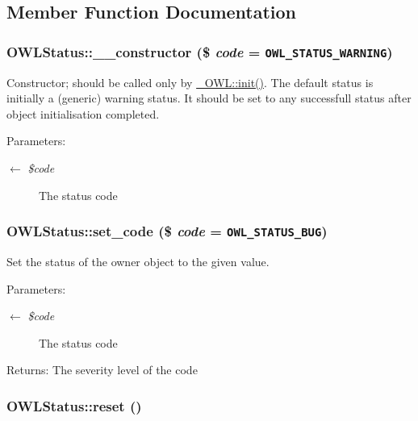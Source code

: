 \subsection{Member Function Documentation}
\hypertarget{classOWLStatus_ff9ed27ec31da2d4f5719aa1d522fea6}{
\subsubsection{\setlength{\rightskip}{0pt plus 5cm}OWLStatus::\_\-\_\-constructor (\$ {\em code} = {\tt OWL\_\-STATUS\_\-WARNING})}}
\label{classOWLStatus_ff9ed27ec31da2d4f5719aa1d522fea6}


Constructor; should be called only by \hyperlink{class__OWL_e0ef3ded56e8a6b34b6461e5a721cd3e}{\_\-OWL::init()}. The default status is initially a (generic) warning status. It should be set to any successfull status after object initialisation completed.

\begin{Desc}
\item[Parameters:]
\begin{description}
\item[\mbox{$\leftarrow$} {\em \$code}]The status code \end{description}
\end{Desc}
\hypertarget{classOWLStatus_1082207e060022757110d0aedbb524b1}{
\subsubsection{\setlength{\rightskip}{0pt plus 5cm}OWLStatus::set\_\-code (\$ {\em code} = {\tt OWL\_\-STATUS\_\-BUG})}}
\label{classOWLStatus_1082207e060022757110d0aedbb524b1}


Set the status of the owner object to the given value.

\begin{Desc}
\item[Parameters:]
\begin{description}
\item[\mbox{$\leftarrow$} {\em \$code}]The status code \end{description}
\end{Desc}
\begin{Desc}
\item[Returns:]The severity level of the code \end{Desc}
\hypertarget{classOWLStatus_f3fedee6b36500fe4ecf31e1d51fe5ff}{
\subsubsection{\setlength{\rightskip}{0pt plus 5cm}OWLStatus::reset ()}}
\label{classOWLStatus_f3fedee6b36500fe4ecf31e1d51fe5ff}


